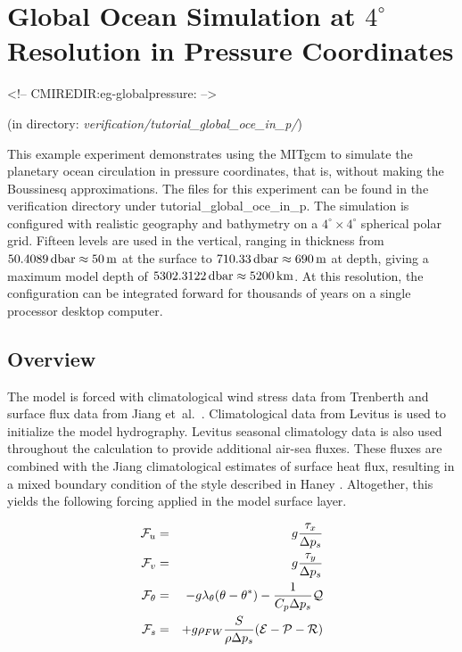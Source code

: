 
\section[P coordinate Global Ocean MITgcm Example]{Global Ocean Simulation at $4^\circ$ Resolution in Pressure
  Coordinates}
\label{www:tutorials}
\label{sect:eg-globalpressure}
\begin{rawhtml}
<!-- CMIREDIR:eg-globalpressure: -->
\end{rawhtml}
\begin{center}
(in directory: {\it verification/tutorial\_global\_oce\_in\_p/})
\end{center}


This example experiment demonstrates using the MITgcm to simulate the
planetary ocean circulation in pressure coordinates, that is, without
making the Boussinesq approximations. The files for this experiment
can be found in the verification directory under tutorial\_global\_oce\_in\_p.
The simulation is configured
with realistic geography and bathymetry on a $4^{\circ} \times
4^{\circ}$ spherical polar grid.  Fifteen levels are used in the
vertical, ranging in thickness from
$50.4089\mbox{\,dbar}\approx50\mbox{\,m}$ at the surface to
$710.33\mbox{\,dbar}\approx690\mbox{\,m}$ at depth, giving a maximum
model depth of $5302.3122\mbox{\,dbar}\approx5200\mbox{\,km}$.  At
this resolution, the configuration can be integrated forward for
thousands of years on a single processor desktop computer.


\subsection{Overview}
\label{www:tutorials}

The model is forced with climatological wind stress data from
Trenberth \cite{trenberth90} and surface flux data from Jiang et~al.\ 
\cite{jiang99}. Climatological data from Levitus \cite{Levitus94} is
used to initialize the model hydrography.  Levitus seasonal
climatology data is also used throughout the calculation to provide
additional air-sea fluxes.  These fluxes are combined with the Jiang
climatological estimates of surface heat flux, resulting in a mixed
boundary condition of the style described in Haney \cite{Haney}.
Altogether, this yields the following forcing applied in the model
surface layer.

\begin{eqnarray}
\label{EQ:eg-global_forcing_pcoord}
\label{EQ:eg-global_forcing_fu_pcoord}
{\cal F}_{u} & = & g\frac{\tau_{x}}{\Delta p_{s}}
\\
\label{EQ:eg-global_forcing_fv_pcoord}
{\cal F}_{v} & = & g\frac{\tau_{y}}{\Delta p_{s}}
\\
\label{EQ:eg-global_forcing_ft_pcoord}
{\cal F}_{\theta} & = & - g\lambda_{\theta} ( \theta - \theta^{\ast} ) 
 - \frac{1}{C_{p} \Delta p_{s}}{\cal Q}
\\
\label{EQ:eg-global_forcing_fs_pcoord}
{\cal F}_{s} & = &
 + g\rho_{FW}\frac{S}{\rho\Delta p_{s}}({\cal E} - {\cal P} - {\cal R})
\end{eqnarray}


